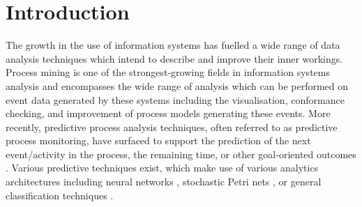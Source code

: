 \section{Introduction}\label{sec:introduction}

The growth in the use of information systems has fuelled a wide range of data analysis techniques which intend to describe and improve their inner workings.
Process mining \cite{van2016data} is one of the strongest-growing fields in information systems analysis and encompasses the wide range of analysis which can be performed on event data generated by these systems including the visualisation, conformance checking, and improvement of process models generating these events.
More recently, predictive process analysis techniques, often referred to as predictive process monitoring, have surfaced to support the prediction of the next event/activity in the process, the remaining time, or other goal-oriented outcomes \cite{DBLP:conf/bpm/Francescomarino18}.
Various predictive techniques exist, which make use of various analytics architectures including neural networks \cite{DBLP:conf/caise/TaxVRD17}, stochastic Petri nets \cite{DBLP:conf/icsoc/Rogge-SoltiW13}, or general classification techniques \cite{DBLP:journals/tkdd/TeinemaaDRM19}.

